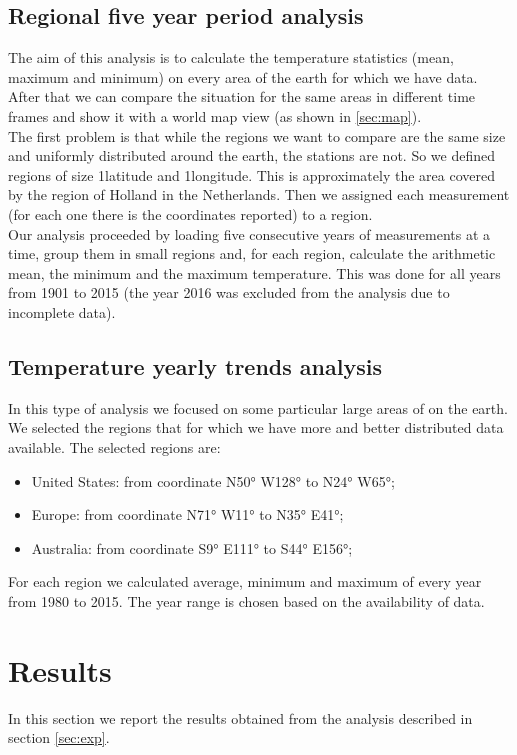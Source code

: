 \documentclass{vldb}
\begin{document}
\subsection{Regional five year period analysis}
The aim of this analysis is to calculate the temperature statistics (mean, maximum and minimum) on every area of the earth for which we have data. After that we can compare the situation for the same areas in different time frames and show it with a world map view (as shown in \ref{sec:map}). \\
The first problem is that while the regions we want to compare are the same size and uniformly distributed around the earth, the stations are not. So we defined regions of size 1\degree latitude and 1\degree longitude. This is approximately the area covered by the region of Holland in the Netherlands. Then we assigned each measurement (for each one there is the coordinates reported) to a region. \\
Our analysis proceeded by loading five consecutive years of measurements at a time, group them in small regions and, for each region, calculate the arithmetic mean, the minimum and the maximum temperature. This was done for all years from 1901 to 2015 (the year 2016 was excluded from the analysis due to incomplete data).\\


\subsection{Temperature yearly trends analysis}
In this type of analysis we focused on some particular large areas of on the earth. We selected the regions that for which we have more and better distributed data available. The selected regions are:
\begin{itemize}
    \item United States: from coordinate N\ang{50;;} W\ang{128;;} to N\ang{24;;} W\ang{65;;};
    \item Europe: from coordinate N\ang{71;;} W\ang{11;;} to N\ang{35;;} E\ang{41;;};
    \item Australia: from coordinate S\ang{9;;} E\ang{111;;} to S\ang{44;;} E\ang{156;;};
\end{itemize}
For each region we calculated average, minimum and maximum of every year from 1980 to 2015. The year range is chosen based on the availability of data.

\section{Results}
\label{sec:res}
In this section we report the results obtained from the analysis described in section \ref{sec:exp}. 
\end{document}
